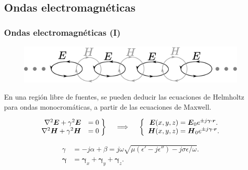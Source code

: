 \documentclass{beamer}
\renewcommand{\vec}[1]{\boldsymbol{#1}}
\begin{document}
		\subsection{Ondas electromagnéticas}
		\begin{frame}
		\frametitle{Ondas electromagnéticas (I)}
		
		\begin{figure}[h]
			\centering
			\includegraphics[width=1\textwidth]{Presentacion/onda_em.pdf}
		\end{figure}
		
		En una región libre de fuentes, se pueden deducir las ecuaciones de Helmholtz para ondas monocromáticas, a partir de las ecuaciones de Maxwell.
				
		\begin{align*}
		\left.\begin{array}{rr@{\mskip\thickmuskip}l}
		\nabla^2  \vec{E} + \gamma^2 \vec{E} &= 0\\
		\nabla^2 \vec{H} + \gamma^2 \vec{H}& = 0
		\end{array} \right\}
		\quad \implies \quad
		\left\{\begin{array}{r@{\mskip\thickmuskip}l}
		\vec{E}(x,y,z) &= \vec{E}_0 e^{\pm j \vec{\gamma}\cdot \vec{r}}. \\
		\vec{H}(x,y,z) &= \vec{H}_0 e^{\pm j \vec{\gamma}\cdot \vec{r}}.
		\end{array}\right.
		\end{align*}
		
		\begin{block}{}
			\setlength\abovedisplayskip{0pt}	
			\begin{align*}
			\gamma &= -j\alpha + \beta = j\omega \sqrt{\mu (\epsilon'-j\epsilon'') - j \sigma \epsilon/\omega}.\\
			\vec{\gamma} &= \vec{\gamma}_x + \vec{\gamma}_y +\vec{\gamma}_z.
			\end{align*}
		\end{block}

		\end{frame}
	
\end{document}
